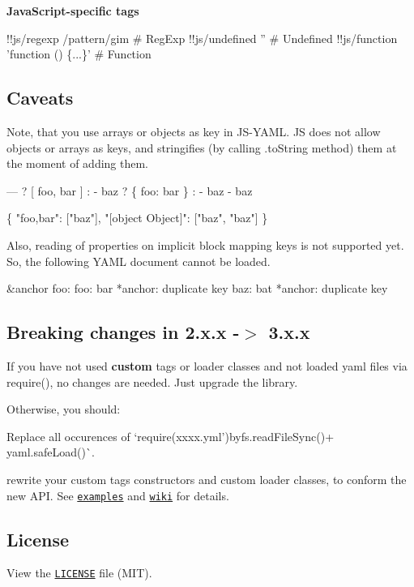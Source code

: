 {\bfseries Java\+Script-\/specific tags}


\begin{DoxyCode}
!!js/regexp /pattern/gim            # RegExp
!!js/undefined ''                   # Undefined
!!js/function 'function () \{...\}'   # Function
\end{DoxyCode}


\subsection*{Caveats }

Note, that you use arrays or objects as key in J\+S-\/\+Y\+A\+ML. JS does not allow objects or arrays as keys, and stringifies (by calling .to\+String method) them at the moment of adding them.


\begin{DoxyCode}
---
? [ foo, bar ]
: - baz
? \{ foo: bar \}
: - baz
  - baz
\end{DoxyCode}



\begin{DoxyCode}
\{ "foo,bar": ["baz"], "[object Object]": ["baz", "baz"] \}
\end{DoxyCode}


Also, reading of properties on implicit block mapping keys is not supported yet. So, the following Y\+A\+ML document cannot be loaded.


\begin{DoxyCode}
&anchor foo:
  foo: bar
  *anchor: duplicate key
  baz: bat
  *anchor: duplicate key
\end{DoxyCode}


\subsection*{Breaking changes in 2.\+x.\+x -\/$>$ 3.\+x.\+x }

If you have not used {\bfseries custom} tags or loader classes and not loaded yaml files via {\ttfamily require()}, no changes are needed. Just upgrade the library.

Otherwise, you should\+:


\begin{DoxyEnumerate}
\item Replace all occurences of `require(\textquotesingle{}xxxx.\+yml'){\ttfamily by}fs.\+read\+File\+Sync(){\ttfamily + }yaml.\+safe\+Load()\`{}.
\item rewrite your custom tags constructors and custom loader classes, to conform the new A\+PI. See \href{https://github.com/nodeca/js-yaml/tree/master/examples}{\tt examples} and \href{https://github.com/nodeca/js-yaml/wiki}{\tt wiki} for details.
\end{DoxyEnumerate}

\subsection*{License }

View the \href{https://github.com/nodeca/js-yaml/blob/master/LICENSE}{\tt L\+I\+C\+E\+N\+SE} file (M\+IT). 